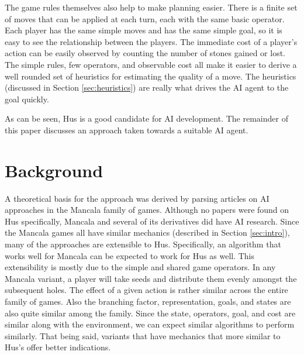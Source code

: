 \documentclass[]{article}
\begin{document}
The game rules themselves also help to make planning easier. There is a finite set of moves that can be applied at each turn, each with the same basic operator. Each player has the same simple moves and has the same simple goal, so it is easy to see the relationship between the players. The immediate cost of a player's action can be easily observed by counting the number of stones gained or lost. The simple rules, few operators, and observable cost all make it easier to derive a well rounded set of heuristics for estimating the quality of a move. The heuristics (discussed in Section \ref{sec:heuristics}) are really what drives the AI agent to the goal quickly. 



As can be seen, Hus is a good candidate for AI development. The remainder of this paper discusses an approach taken towards a suitable AI agent. 


\section{Background}
A theoretical basis for the approach was derived by parsing articles on AI approaches in the Mancala family of games. Although no papers were found on Hus specifically, Mancala and several of its derivatives did have AI research. Since the Mancala games all have similar mechanics (described in Section \ref{sec:intro}), many of the approaches are extensible to Hus. Specifically, an algorithm that works well for Mancala can be expected to work for Hus as well. This extensibility is mostly due to the simple and shared game operators. In any Mancala variant, a player will take seeds and distribute them evenly amongst the subsequent holes. The effect of a given action is rather similar across the entire family of games. Also the branching factor, representation, goals, and states are also quite similar among the family. Since the state, operators, goal, and cost are similar along with the environment, we can expect similar algorithms to perform similarly. That being said, variants that have mechanics that more similar to Hus's offer better indications.
\end{document}
